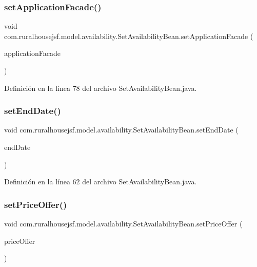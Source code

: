 \subsubsection{\texorpdfstring{setApplicationFacade()}{setApplicationFacade()}}
{\footnotesize\ttfamily void com.\+ruralhousejsf.\+model.\+availability.\+Set\+Availability\+Bean.\+set\+Application\+Facade (\begin{DoxyParamCaption}\item[{\mbox{\hyperlink{a00136}{Application\+Facade\+Interface}}}]{application\+Facade }\end{DoxyParamCaption})}



Definición en la línea 78 del archivo Set\+Availability\+Bean.\+java.

\mbox{\label{a00228_a29c747d6a871c8c0f1eb3806461b1d32}} 
\subsubsection{\texorpdfstring{setEndDate()}{setEndDate()}}
{\footnotesize\ttfamily void com.\+ruralhousejsf.\+model.\+availability.\+Set\+Availability\+Bean.\+set\+End\+Date (\begin{DoxyParamCaption}\item[{Date}]{end\+Date }\end{DoxyParamCaption})}



Definición en la línea 62 del archivo Set\+Availability\+Bean.\+java.

\mbox{\label{a00228_a89e2a4719579d3e5865dd940bf7c5649}} 
\subsubsection{\texorpdfstring{setPriceOffer()}{setPriceOffer()}}
{\footnotesize\ttfamily void com.\+ruralhousejsf.\+model.\+availability.\+Set\+Availability\+Bean.\+set\+Price\+Offer (\begin{DoxyParamCaption}\item[{double}]{price\+Offer }\end{DoxyParamCaption})}



